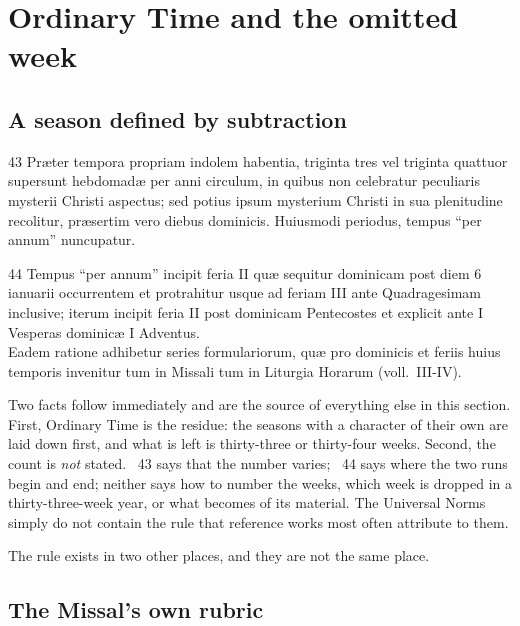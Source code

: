 \section{Ordinary Time and the omitted week}
\label{sec:ot}

\subsection{A season defined by subtraction}

\begin{normtext}{ 43}
Præter tempora propriam indolem habentia, triginta tres vel triginta quattuor supersunt hebdomadæ
per anni circulum, in quibus non celebratur peculiaris mysterii Christi aspectus; sed potius ipsum
mysterium Christi in sua plenitudine recolitur, præsertim vero diebus dominicis. Huiusmodi periodus,
tempus ``per annum'' nuncupatur.
\end{normtext}

\begin{normtext}{ 44}
Tempus ``per annum'' incipit feria II quæ sequitur dominicam post diem 6 ianuarii occurrentem et
protrahitur usque ad feriam III ante Quadragesimam inclusive; iterum incipit feria II post dominicam
Pentecostes et explicit ante I Vesperas dominicæ I Adventus.\\
Eadem ratione adhibetur series formulariorum, quæ pro dominicis et feriis huius temporis invenitur
tum in Missali tum in Liturgia Horarum (voll.\ III-IV).
\end{normtext}

Two facts follow immediately and are the source of everything else in this section. First, Ordinary
Time is the residue: the seasons with a character of their own are laid down first, and what is left
is thirty-three or thirty-four weeks. Second, the count is \emph{not} stated. ~43 says
that the number varies; ~44 says where the two runs begin and end; neither says how to
number the weeks, which week is dropped in a thirty-three-week year, or what becomes of its
material. The Universal Norms simply do not contain the rule that reference works most often
attribute to them.

The rule exists in two other places, and they are not the same place.

\subsection{The Missal's own rubric}

